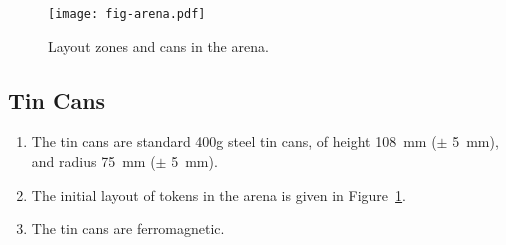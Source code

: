 \begin{figure}
  \texttt{[image: fig-arena.pdf]}
  \caption{Layout zones and cans in the arena.}
  \label{fig:arena}
\end{figure}

\subsection{Tin Cans}
\label{spec:cans}

\begin{enumerate}
  \item The tin cans are standard 400g steel tin cans, of height \SI{108}{mm}
        ($\pm$ \SI{5}{mm}), and radius \SI{75}{mm} ($\pm$ \SI{5}{mm}).
  \item The initial layout of tokens in the arena is given in
        Figure~\ref{fig:arena}.
  \item The tin cans are ferromagnetic.
\end{enumerate}

